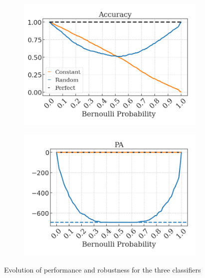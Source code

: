 \begin{figure}[H]
    \centering
    \begin{subfigure}[b]{0.45\textwidth}
        \centering
        \includegraphics[width=\textwidth]{img/results_discussion/empirical/artificial_acc_final.png}
    \end{subfigure}
    \hfill
    \begin{subfigure}[b]{0.45\textwidth}
        \centering
        \includegraphics[width=\textwidth]{img/results_discussion/empirical/artificial_logPA_final.png}
    \end{subfigure}
    \caption{Evolution of performance and robustness for the three classifiers}
    \label{fig:empirical_plot}
\end{figure}




